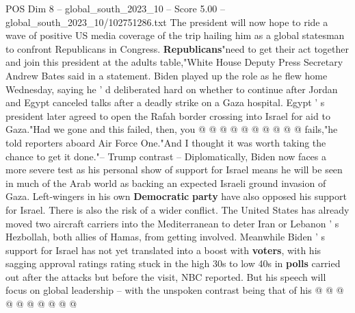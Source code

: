 \begin{textsample}{POS Dim 8 – global\_south\_2023\_10 – Score 5.00 – global\_south\_2023\_10/102751286.txt}
The president will now hope to ride a wave of positive US media coverage of the trip hailing him as a global statesman to confront Republicans in Congress. \textbf{Republicans}"need to get their act together and join this president at the adults table,"White House Deputy Press Secretary Andrew Bates said in a statement.
Biden played up the role as he flew home Wednesday, saying he ' d deliberated hard on whether to continue after Jordan and Egypt canceled talks after a deadly strike on a Gaza hospital.
Egypt ' s president later agreed to open the Rafah border crossing into Israel for aid to Gaza."Had we gone and this failed, then, you @ @ @ @ @ @ @ @ @ @ fails,"he told reporters aboard Air Force One."And I thought it was worth taking the chance to get it done."-- Trump contrast -- Diplomatically, Biden now faces a more severe test as his personal show of support for Israel means he will be seen in much of the Arab world as backing an expected Israeli ground invasion of Gaza.
Left-wingers in his own \textbf{Democratic} \textbf{party} have also opposed his support for Israel.
There is also the risk of a wider conflict.
The United States has already moved two aircraft carriers into the Mediterranean to deter Iran or Lebanon ' s Hezbollah, both allies of Hamas, from getting involved.
Meanwhile Biden ' s support for Israel has not yet translated into a boost with \textbf{voters}, with his sagging approval ratings rating stuck in the high 30s to low 40s in \textbf{polls} carried out after the attacks but before the visit, NBC reported.
But his speech will focus on global leadership -- with the unspoken contrast being that of his @ @ @ @ @ @ @ @ @ @

\end{textsample}
